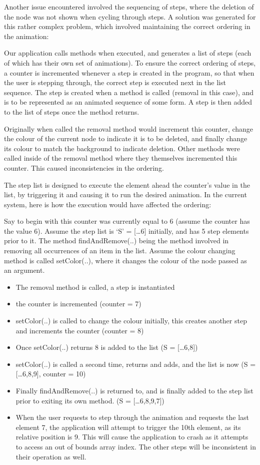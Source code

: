 \documentclass{l3proj}
\begin{document}
Another issue encountered involved the sequencing of steps, where the deletion of the node was not shown when cycling through steps. A solution was generated for this rather complex problem, which involved maintaining the correct ordering in the animation:

Our application calls methods when executed, and generates a list of steps (each of which has their own set of animations). To ensure the correct ordering of steps, a counter is incremented whenever a step is created in the program, so that when the user is stepping through, the correct step is executed next in the list sequence. The step is created when a method is called (removal in this case), and is to be represented as an animated sequence of some form. A step is then added to the list of steps once the method returns.

Originally when called the removal method would increment this counter, change the colour of the current node to indicate it is to be deleted, and finally change its colour to match the background to indicate deletion. Other methods were called inside of the removal method where they themselves incremented this counter. This caused inconsistencies in the ordering.

The step list is designed to execute the element ahead the counter’s value in the list, by triggering it and causing it to run the desired animation. 
In the current system, here is how the execution would have affected the ordering:

Say to begin with this counter was currently equal to 6 (assume the counter has the value 6). Assume the step list is ‘S’ = […6] initially, and has 5 step elements prior to it. The method findAndRemove(..) being the method involved in removing all occurrences of an item in the list.
Assume the colour changing method is called setColor(..), where it changes the colour of the node passed as an argument.

\begin{itemize}
\item The removal method is called, a step is instantiated
\item the counter is incremented (counter = 7)
\item setColor(..) is called to change the colour initially, this creates another step and increments the counter (counter = 8)
\item Once setColor(..) returns 8 is added to the list (S = […6,8]) 
\item setColor(..) is called a second time, returns and adds, and the list is now (S = […6,8,9], counter = 10) 
\item Finally findAndRemove(..) is returned to, and is finally added to the step list prior to exiting its own method. (S = […6,8,9,7])
\item When the user requests to step through the animation and requests the last element 7, the application will attempt to trigger the 10th element, as its relative position is 9. This will cause the application to crash as it attempts to access an out of bounds array index. The other steps will be inconsistent in their operation as well.
\end{itemize}
\end{document}
